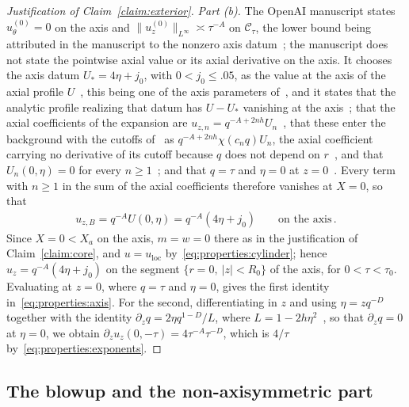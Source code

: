 \documentclass[11pt,reqno]{amsproc}
\numberwithin{equation}{section}
\theoremstyle{remark}
\newcommand{\p}{\partial}
\begin{document}
\begin{proof}[Justification of Claim~\ref{claim:exterior}]
\smallskip
\noindent\emph{Part (b).} The OpenAI manuscript states $u^{(0)}_\theta=0$ on the axis and $\|u^{(0)}_z\|_{L^\infty}\asymp\tau^{-A}$ on $\mathcal C_\tau$, the lower bound being attributed in the manuscript to the nonzero axis datum~\cite[pp.~7--8]{OpenAIManuscript}; the manuscript does not state the pointwise axial value or its axial derivative on the axis. It chooses the axis datum $U_*=4\eta+j_0$, with $0<j_0\le.05$, as the value at the axis of the axial profile $U$~\cite[Section~B.1 and equation~(B.1), p.~144]{OpenAIManuscript}, this being one of the axis parameters of~\cite[Proposition~4.10, pp.~36--37]{OpenAIManuscript}, and it states that the analytic profile realizing that datum has $U-U_*$ vanishing at the axis~\cite[Proposition~B.2 and equation~(B.12), pp.~146--147]{OpenAIManuscript}; that the axial coefficients of the expansion are $u_{z,n}=q^{-A+2nh}U_n$~\cite[equation~(5.1), p.~46]{OpenAIManuscript}, that these enter the background with the cutoffs of~\cite[equation~(5.45), p.~61]{OpenAIManuscript} as $q^{-A+2nh}\chi(c_nq)U_n$, the axial coefficient carrying no derivative of its cutoff because $q$ does not depend on $r$~\cite[equation~(10.1), p.~117]{OpenAIManuscript}, and that $U_n(0,\eta)=0$ for every $n\ge1$~\cite[Lemma~5.1, p.~47]{OpenAIManuscript}; and that $q=\tau$ and $\eta=0$ at $z=0$~\cite[p.~116, Step~5]{OpenAIManuscript}. Every term with $n\ge1$ in the sum of the axial coefficients therefore vanishes at $X=0$, so that
\begin{align*}
u_{z,B}=q^{-A}U(0,\eta)=q^{-A}(4\eta+j_0)
\qquad\mbox{on the axis}
\,.
\end{align*}
Since $X=0<X_a$ on the axis, $m=w=0$ there as in the justification of Claim~\ref{claim:core}, and $u=u_{\mathrm{loc}}$ by~\eqref{eq:properties:cylinder}; hence $u_z=q^{-A}(4\eta+j_0)$ on the segment $\{r=0,\ |z|<R_0\}$ of the axis, for $0<\tau<\tau_0$. Evaluating at $z=0$, where $q=\tau$ and $\eta=0$, gives the first identity in~\eqref{eq:properties:axis}. For the second, differentiating in $z$ and using $\eta=zq^{-D}$ together with the identity $\p_zq=2\eta q^{1-D}/L$, where $L=1-2h\eta^2$~\cite[equation~(4.1), p.~24, and the proof of Lemma~4.1, p.~25]{OpenAIManuscript}, so that $\p_zq=0$ at $\eta=0$, we obtain $\p_zu_z(0,-\tau)=4\tau^{-A}\tau^{-D}$, which is $4/\tau$ by~\eqref{eq:properties:exponents}.
\end{proof}

\subsection{The blowup and the non-axisymmetric part}
\label{sec:properties:waves}
\end{document}
